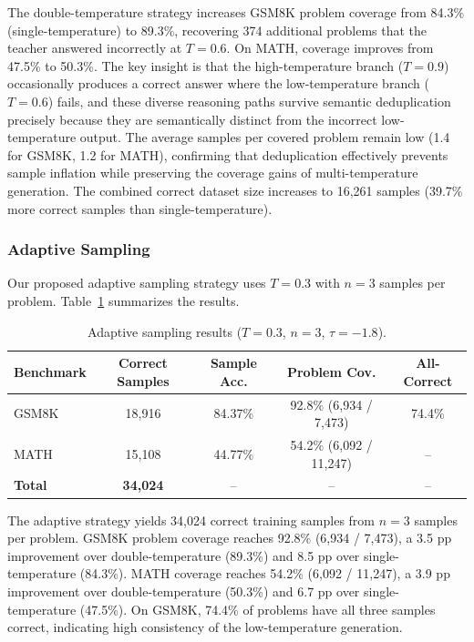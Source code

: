 \documentclass{article}
\begin{document}
The double-temperature strategy increases GSM8K problem coverage from 84.3\% (single-temperature) to 89.3\%, recovering 374 additional problems that the teacher answered incorrectly at $T = 0.6$. On MATH, coverage improves from 47.5\% to 50.3\%. The key insight is that the high-temperature branch ($T = 0.9$) occasionally produces a correct answer where the low-temperature branch ($T = 0.6$) fails, and these diverse reasoning paths survive semantic deduplication precisely because they are semantically distinct from the incorrect low-temperature output. The average samples per covered problem remain low (1.4 for GSM8K, 1.2 for MATH), confirming that deduplication effectively prevents sample inflation while preserving the coverage gains of multi-temperature generation. The combined correct dataset size increases to 16,261 samples (39.7\% more correct samples than single-temperature).

\subsubsection{Adaptive Sampling}

Our proposed adaptive sampling strategy uses $T = 0.3$ with $n = 3$ samples per problem. Table~\ref{tab:adaptive} summarizes the results.

\begin{table}[H]
\centering
\caption{Adaptive sampling results ($T = 0.3$, $n = 3$, $\tau = -1.8$).}
\label{tab:adaptive}
\begin{tabular}{lcccc}
\toprule
\textbf{Benchmark} & \textbf{Correct Samples} & \textbf{Sample Acc.} & \textbf{Problem Cov.} & \textbf{All-Correct} \\
\midrule
GSM8K  & 18,916 & 84.37\% & 92.8\% (6,934 / 7,473) & 74.4\% \\
MATH   & 15,108 & 44.77\% & 54.2\% (6,092 / 11,247) & -- \\
\midrule
\textbf{Total} & \textbf{34,024} & -- & -- & -- \\
\bottomrule
\end{tabular}
\end{table}

The adaptive strategy yields 34,024 correct training samples from $n = 3$ samples per problem. GSM8K problem coverage reaches 92.8\% (6,934 / 7,473), a 3.5 pp improvement over double-temperature (89.3\%) and 8.5 pp over single-temperature (84.3\%). MATH coverage reaches 54.2\% (6,092 / 11,247), a 3.9 pp improvement over double-temperature (50.3\%) and 6.7 pp over single-temperature (47.5\%). On GSM8K, 74.4\% of problems have all three samples correct, indicating high consistency of the low-temperature generation.
\end{document}
